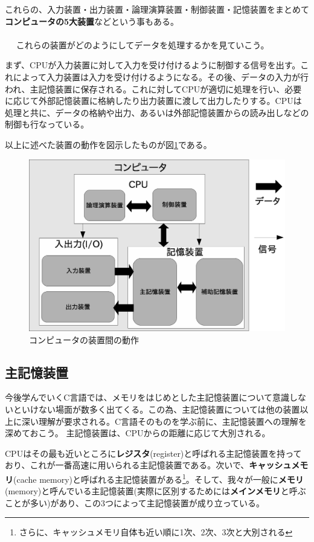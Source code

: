 これらの、入力装置・出力装置・論理演算装置・制御装置・記憶装置をまとめて\textbf{コンピュータの5大装置}などという事もある。
\\ \\　
これらの装置がどのようにしてデータを処理するかを見ていこう。

まず、CPUが入力装置に対して入力を受け付けるように制御する信号を出す。これによって入力装置は入力を受け付けるようになる。その後、データの入力が行われ、主記憶装置に保存される。これに対してCPUが適切に処理を行い、必要に応じて外部記憶装置に格納したり出力装置に渡して出力したりする。CPUは処理と共に、データの格納や出力、あるいは外部記憶装置からの読み出しなどの制御も行なっている。

以上に述べた装置の動作を図示したものが図\ref{fig0_1}である。
\begin{figure}[htb]
\centering
\includegraphics[width=0.9\linewidth,keepaspectratio]{fig0_1.eps}
\caption{コンピュータの装置間の動作}\label{fig0_1}
\end{figure}

\subsection{主記憶装置}
今後学んでいくC言語では、メモリをはじめとした主記憶装置について意識しないといけない場面が数多く出てくる。この為、主記憶装置については他の装置以上に深い理解が要求される。C言語そのものを学ぶ前に、主記憶装置への理解を深めておこう。
主記憶装置は、CPUからの距離に応じて大別される。

CPUはその最も近いところに\textbf{レジスタ}(register)と呼ばれる主記憶装置を持っており、これが一番高速に用いられる主記憶装置である。次いで、\textbf{キャッシュメモリ}(cache memory)と呼ばれる主記憶装置がある\footnote{さらに、キャッシュメモリ自体も近い順に1次、2次、3次と大別される}。そして、我々が一般に\textbf{メモリ}(memory)と呼んでいる主記憶装置(実際に区別するためには\textbf{メインメモリ}と呼ぶことが多い)があり、この3つによって主記憶装置が成り立っている。

